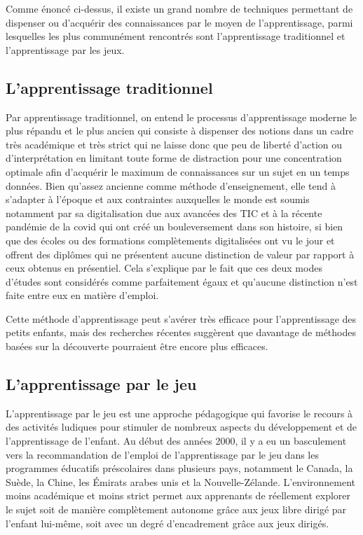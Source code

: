 Comme énoncé ci-dessus, il existe un grand nombre de techniques permettant de dispenser ou d'acquérir des connaissances par le moyen de l'apprentissage, parmi lesquelles les plus communément rencontrés sont l'apprentissage traditionnel et l'apprentissage par les jeux.

\subsection{L'apprentissage traditionnel}

Par apprentissage traditionnel, on entend le processus d'apprentissage moderne le plus répandu et le plus ancien qui consiste à dispenser des notions dans un cadre très académique et très strict qui ne laisse donc que peu de liberté d'action ou d'interprétation en limitant toute forme de distraction pour une concentration optimale afin
d'acquérir le maximum de connaissances sur un sujet en un temps données. Bien qu'assez ancienne comme méthode d'enseignement, elle tend à s'adapter à l'époque et aux contraintes auxquelles le monde est soumis notamment par sa digitalisation due aux avancées des TIC et à la récente pandémie de la covid qui ont créé un bouleversement dans son histoire, si bien que des écoles ou des formations
complètements digitalisées ont vu le jour et offrent des diplômes qui ne présentent aucune distinction de valeur par rapport à ceux obtenus en présentiel. Cela s'explique par le fait que ces deux modes d'études sont considérés comme parfaitement égaux et qu'aucune distinction n'est faite entre eux en matière d'emploi\cite{radovic2010advantages}.

Cette méthode d'apprentissage peut s'avérer très efficace pour l'apprentissage des petits enfants, mais des recherches récentes suggèrent que davantage de méthodes basées sur la découverte pourraient être encore plus efficaces.\cite{Weisberg2018GuidedPlay}

\subsection{L'apprentissage par le jeu}

L'apprentissage par le jeu est une approche pédagogique qui favorise le recours à des activités
ludiques pour stimuler de nombreux aspects du développement et de l'apprentissage de l'enfant\cite{AngelaPyle2018Apprentissage}.
Au début des années 2000, il y a eu un basculement vers la recommandation de l’emploi de
l’apprentissage par le jeu dans les programmes éducatifs préscolaires dans plusieurs pays,
notamment le Canada,\cite{whitebread2009play}
la Suède,\cite{Daubert2018Play}
la Chine,\cite{pyle2017continuum}
les Émirats arabes unis\cite{Hassinger2018Playing}
et la Nouvelle-Zélande\cite{Daubert2018Play}. L'environnement moins académique et moins strict permet aux apprenants de réellement explorer
le sujet soit de manière complètement autonome grâce aux jeux libre\cite{Berk2018Role} dirigé par l'enfant lui-même, soit avec un degré d'encadrement grâce aux jeux dirigés\cite{Bergen2018Cognitive}.

